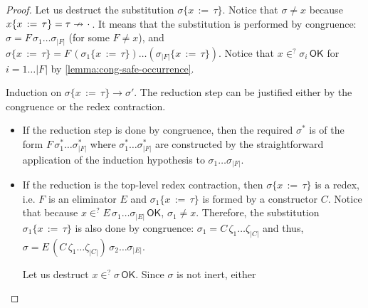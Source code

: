 \documentclass[a4,natbib=false]{article}
\newcommand{\ilyam}[1]{{\color{red} \texttt{Ilya:  #1}}}
\newcommand{\subst}[3]{{#1}\{{#2}\,:=\,{#3}\}}
\newcommand{\spcdot}{\mkern 2mu\cdot\mkern 2mu}
\newcommand{\reduces}[2]{{#1} \rightarrow {#2}}
\newcommand{\narg}[1]{|{#1}|}
\newcommand{\judgeSok}[2]{{#1} \in^{?} {#2}\,\mathsf{OK}}
\newcommand{\fv}[1]{\mathsf{FV}(#1)}
\newcommand{\fullterm}[2]{{#1}\,#2_1 \dots #2_{\narg{#1}}}
\begin{document}
\begin{proof}
  Let us destruct the substitution $\subst{\sigma}{x}{\tau}$. Notice that
  $\sigma \neq x$ because $\subst{x}{x}{\tau} = \tau \nrightarrow \spcdot$. It
  means that the substitution is performed by congruence: $\sigma =
  \fullterm{F}{\sigma}$ (for some $F \neq x$), and $\subst{\sigma}{x}{\tau} =
  F\, (\subst{\sigma_1}{x}{\tau}) \dots (\subst{\sigma_{\narg{F}}}{x}{\tau}) $.
  Notice that $\judgeSok{x}{\sigma_i}$ for $i = 1 \dots \narg F$ by
  \cref{lemma:cong-safe-occurrence}.

  Induction on $\reduces{\subst{\sigma}{x}{\tau}}{\sigma'}$.
  The reduction step can be justified either by the congruence or the redex contraction.
  \begin{itemize}
  \item If the reduction step is done by congruence, then the required
    $\sigma^*$ is of the form $\fullterm{F}{\sigma^*}$ where $\sigma^*_1 \dots
    \sigma^*_{\narg{F}}$ are constructed by the straightforward application of
    the induction hypothesis to $\sigma_1 \dots \sigma_{\narg{F}}$.

  \item If the reduction is the top-level redex contraction, then
    $\subst{\sigma}{x}{\tau}$ is a redex, i.e. $F$ is an eliminator $E$ and
    $\subst{\sigma_1}{x}{\tau}$ is formed by a constructor $C$.
    Notice that because
    $\judgeSok{x}{\fullterm{E}{\sigma}}$, $\sigma_1
    \neq x$. Therefore, the substitution $\subst{\sigma_1}{x}{\tau}$ is also done by
    congruence: $\sigma_1 = \fullterm{C}{\zeta}$ and thus,
    $\sigma = E \, (\fullterm{C}{\zeta}) \, \sigma_2 \dots \sigma_{\narg{E}}$.

    Let us destruct $\judgeSok{x}{\sigma}$. Since $\sigma$ is not inert, either
  \end{itemize}
\end{proof}
\end{document}
